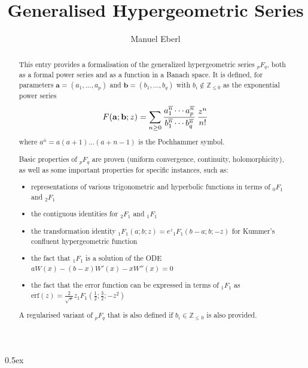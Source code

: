 \documentclass[11pt,a4paper]{article}
\newcommand{\poch}[2]{#1^{\overline{#2}}}
\begin{document}
\title{Generalised Hypergeometric Series}
\author{Manuel Eberl}
\maketitle

\begin{abstract}
This entry provides a formalisation of the generalized hypergeometric series 
${}_p F_{q}$, both as a formal power series and as a function in a Banach space.
It is defined, for parameters $\textbf{a}=(a_1,\ldots,a_p)$ and $\textbf{b}=(b_1,\ldots,b_q)$
with $b_i\notin\mathbb{Z}_{{\leq}0}$ as the exponential power series
\[F(\mathbf{a}; \mathbf{b}; z) = 
    \sum_{n\geq 0} \frac{\poch{a_1}{n} \cdots \poch{a_p}{n}}
                        {\poch{b_1}{n} \cdots \poch{b_q}{n}}\kern2pt \frac{z^n}{n!}\]
where $\poch{a}{n} = a(a+1)\ldots(a+n-1)$ is the Pochhammer symbol.

Basic properties of ${}_p F_{q}$ are proven (uniform convergence, continuity, holomorphicity),
as well as some important properties for specific instances, such as:
\begin{itemize}
\item representations of various trigonometric and hyperbolic functions in terms of ${}_0 F_{1}$
      and ${}_2 F_{1}$
\item the contiguous identities for ${}_2 F_{1}$ and ${}_1 F_{1}$
\item the transformation identity ${}_1 F_1(a;b;z) = e^z {}_1 F_1(b-a;b;-z)$ for Kummer's
confluent hypergeometric function
\item the fact that ${}_1 F_1$ is a solution of the ODE 
      $a W(x) - (b - x) W'(x) - x W''(x) = 0$
\item the fact that the error function can be expressed in terms of ${}_1 F_1$ as
      $\text{erf}(z) = \frac{2}{\sqrt{\pi}} z {}_1 F_{1}(\frac{1}{2};\frac{3}{2};-z^2)$
\end{itemize}
A regularised variant of ${}_p F_{q}$ that is also defined if $b_i\in\mathbb{Z}_{{\leq}\,0}$
is also provided.
\end{abstract}

\tableofcontents

\newpage
\parindent 0pt\parskip 0.5ex



\raggedright
\nocite{duverney}



\end{document}
